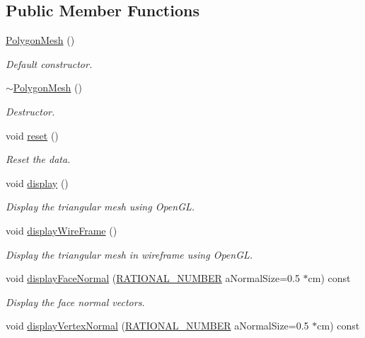 \subsection*{Public Member Functions}
\begin{DoxyCompactItemize}
\item 
\hyperlink{class_graphics_1_1_polygon_mesh_a4a74b31e7615591ec53fb2954617a469}{PolygonMesh} ()
\begin{DoxyCompactList}\small\item\em Default constructor. \end{DoxyCompactList}\item 
\hyperlink{class_graphics_1_1_polygon_mesh_a61906b1f357df6a465202775e4b32aa0}{$\sim$PolygonMesh} ()
\begin{DoxyCompactList}\small\item\em Destructor. \end{DoxyCompactList}\item 
void \hyperlink{class_graphics_1_1_polygon_mesh_a1ff9fbdc31bf7b0c86176b5e99fabd14}{reset} ()
\begin{DoxyCompactList}\small\item\em Reset the data. \end{DoxyCompactList}\item 
void \hyperlink{class_graphics_1_1_polygon_mesh_a0f15277a3f50841998066657a4c3bc41}{display} ()
\begin{DoxyCompactList}\small\item\em Display the triangular mesh using OpenGL. \end{DoxyCompactList}\item 
void \hyperlink{class_graphics_1_1_polygon_mesh_a60a14fd59728ad30a68829bf1647a7f0}{displayWireFrame} ()
\begin{DoxyCompactList}\small\item\em Display the triangular mesh in wireframe using OpenGL. \end{DoxyCompactList}\item 
void \hyperlink{class_graphics_1_1_polygon_mesh_a380deb98652eccfbc3cb577a1a9e1b7a}{displayFaceNormal} (\hyperlink{namespace_utilities_a40969b96bd8d847b962e297cb79f08ce}{RATIONAL\_\-NUMBER} aNormalSize=0.5 $\ast$cm) const 
\begin{DoxyCompactList}\small\item\em Display the face normal vectors. \end{DoxyCompactList}\item 
void \hyperlink{class_graphics_1_1_polygon_mesh_aedad6cac01ba1cd566bdc81dc864f64b}{displayVertexNormal} (\hyperlink{namespace_utilities_a40969b96bd8d847b962e297cb79f08ce}{RATIONAL\_\-NUMBER} aNormalSize=0.5 $\ast$cm) const 

\end{DoxyCompactItemize}
